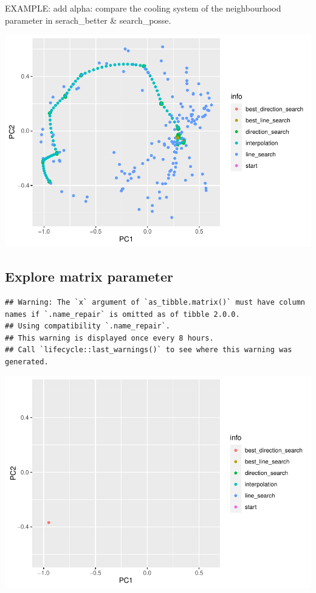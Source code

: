 \documentclass[12pt]{article}
\newenvironment{Shaded}{\begin{snugshade}}{\end{snugshade}}
\newcommand{\KeywordTok}[1]{\textcolor[rgb]{0.13,0.29,0.53}{\textbf{#1}}}
\newcommand{\NormalTok}[1]{#1}
\newcommand{\OperatorTok}[1]{\textcolor[rgb]{0.81,0.36,0.00}{\textbf{#1}}}
\newcommand{\StringTok}[1]{\textcolor[rgb]{0.31,0.60,0.02}{#1}}
\begin{document}
EXAMPLE: add alpha: compare the cooling system of the neighbourhood
parameter in serach\_better \& search\_posse.

\includegraphics{paper_files/figure-latex/unnamed-chunk-8-1.pdf}

\hypertarget{explore-matrix-parameter}{%
\subsection{Explore matrix parameter}\label{explore-matrix-parameter}}

\begin{Shaded}
\end{Shaded}

\begin{verbatim}
## Warning: The `x` argument of `as_tibble.matrix()` must have column names if `.name_repair` is omitted as of tibble 2.0.0.
## Using compatibility `.name_repair`.
## This warning is displayed once every 8 hours.
## Call `lifecycle::last_warnings()` to see where this warning was generated.
\end{verbatim}

\includegraphics{paper_files/figure-latex/unnamed-chunk-9-1.pdf}
\end{document}
